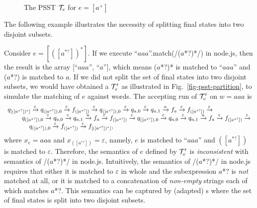 \begin{example}
\begin{figure}[tb]
		\caption{The PSST $\mathcal{T}_e$ for $e = [a^+]$}
		\label{fig-pfa}
	\end{figure}
\end{example}


The following example illustrates the necessity of splitting final states into two disjoint subsets.

\begin{example}\label{exmp-psst-partition}
Consider {\pcre} $e = [([a^{*?}])^{*}]$. If we execute ``$aaa$''.match(/($a$*?)*/)  in node.js, then 
the result is the array $[$``$aaa$'', ``$a$''$]$, which means ($a$*?)* is matched to ``$aaa$'' and ($a$*?) is matched to $a$. If we did not split the set of final states into two disjoint subsets, we would have obtained a {\PSST} $\mathcal{T}^\prime_e$ as illustrated in Fig.~\ref{fig-psst-partition}, to simulate the matching of $e$ against words. The accepting run of $\mathcal{T}^\prime_e$ on $w  = aaa$ is 
%
$$
\begin{array}{l}
q_{[([a^{*?}])^{*}]} \xrightarrow{\varepsilon} 
q_{([a^{*?}]), 0} \xrightarrow{\varepsilon} 
f_{([a^{*?}])} \xrightarrow{\varepsilon} 
q_{([a^{*?}]), 0} \xrightarrow{\varepsilon} 
q_{a, 0} \xrightarrow{\varepsilon}
q_{a, 1} \xrightarrow{a} 
f_a \xrightarrow{\varepsilon} 
f_{([a^{*?}])} \xrightarrow{\varepsilon} 
\\
\hspace*{8mm} 
q_{([a^{*?}]), 0} \xrightarrow{\varepsilon} 
q_{a, 0} \xrightarrow{\varepsilon} 
q_{a, 1} \xrightarrow{a} 
f_a \xrightarrow{\varepsilon} 
f_{([a^{*?}])} \xrightarrow{\varepsilon} 
q_{([a^{*?}]), 0} \xrightarrow{\varepsilon} 
q_{a, 0} \xrightarrow{\varepsilon} 
q_{a, 1} \xrightarrow{a} 
f_a \xrightarrow{\varepsilon} 
f_{([a^{*?}])} \xrightarrow{\varepsilon} 
\\
\hspace*{12mm} 
q_{([a^{*?}]), 0} \xrightarrow{\varepsilon} 
f_{([a^{*?}])} \xrightarrow{\varepsilon} 
f_{[([a^{*?}])^*]},
\end{array}
$$
where $x_{e} = aaa$ and $ x_{([a^{*?}])} = \varepsilon$, namely, $e $ is matched to ``$aaa$''  and  $([a^{*?}])$ is matched to $\varepsilon$. Therefore, the semantics of $e$ defined by $\mathcal{T}^\prime_e$  is \emph{inconsistent} with semantics of /($a$*?)*/ in node.js. Intuitively, the semantics of /($a$*?)*/ in node.js requires that either it is matched to $\varepsilon$ in whole and the subexpression $a$*? is \emph{not} matched at all, or it is matched to a concatenation of \emph{non-empty} strings each of which matches $a$*?. This semantics can be captured by (adapted) {\PSST}s where the set of final states is split into two disjoint subsets.

\end{example}
